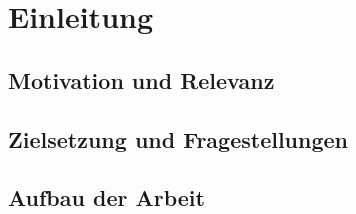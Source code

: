 \chapter{Einleitung}

\section{Motivation und Relevanz}

\section{Zielsetzung und Fragestellungen}

\section{Aufbau der Arbeit}

